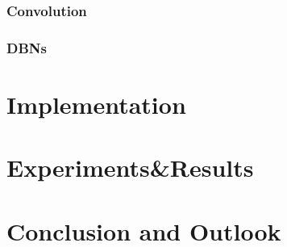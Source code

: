 \subsection{Convolution}
\subsection{DBNs}

\chapter{Implementation}
\chapter{Experiments\&Results}

\chapter{Conclusion and Outlook}